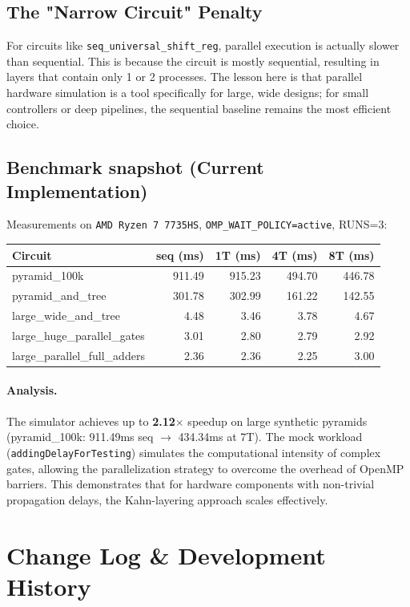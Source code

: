 \documentclass[9pt,a4paper]{article}
\begin{document}
\subsection{The "Narrow Circuit" Penalty}
For circuits like \texttt{seq\_universal\_shift\_reg}, parallel execution is actually slower than sequential. This is because the circuit is mostly sequential, resulting in layers that contain only 1 or 2 processes. The lesson here is that parallel hardware simulation is a tool specifically for large, wide designs; for small controllers or deep pipelines, the sequential baseline remains the most efficient choice.

\subsection{Benchmark snapshot (Current Implementation)}
Measurements on \texttt{AMD~Ryzen~7~7735HS}, \texttt{OMP\_WAIT\_POLICY=active}, RUNS=3:
\begin{center}\small
\begin{tabular}{@{}lrrrr@{}}
\toprule
Circuit & seq (ms) & 1T (ms) & 4T (ms) & 8T (ms) \\
\midrule
pyramid\_100k                & 911.49 & 915.23 & 494.70 & 446.78 \\
pyramid\_and\_tree            & 301.78 & 302.99 & 161.22 & 142.55 \\
large\_wide\_and\_tree         & 4.48   & 3.46   & 3.78   & 4.67 \\
large\_huge\_parallel\_gates   & 3.01   & 2.80   & 2.79   & 2.92 \\
large\_parallel\_full\_adders & 2.36   & 2.36   & 2.25   & 3.00 \\
\bottomrule
\end{tabular}
\end{center}

\paragraph{Analysis.} The simulator achieves up to \textbf{2.12$\times$} speedup on large synthetic pyramids (pyramid\_100k: 911.49ms seq $\to$ 434.34ms at 7T). The mock workload (\texttt{addingDelayForTesting}) simulates the computational intensity of complex gates, allowing the parallelization strategy to overcome the overhead of OpenMP barriers. This demonstrates that for hardware components with non-trivial propagation delays, the Kahn-layering approach scales effectively.

\section{Change Log \& Development History}
\end{document}

